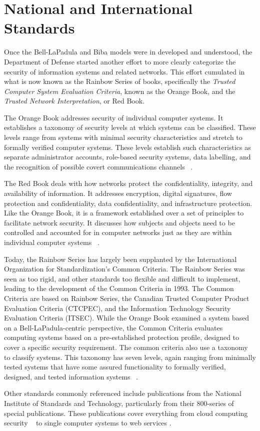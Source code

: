 \section{National and International Standards}
Once the Bell-LaPadula and Biba models were in developed and understood, the Department of Defense started another effort to more clearly categorize the security of information systems and related networks.  This effort cumulated in what is now known as the Rainbow Series of books, specifically the {\it Trusted Computer System Evaluation Criteria}, known as the Orange Book, and the {\it Trusted Network Interpretation}, or Red Book.

The Orange Book addresses security of individual computer systems.  It establishes a taxonomy of security levels at which systems can be classified.  These levels range from systems with minimal security characteristics and stretch to formally verified computer systems.  These levels establish such characteristics as separate administrator accounts, role-based security systems, data labelling, and the recognition of possible covert communications channels ~\cite{OrangeBook}.

The Red Book deals with how networks protect the confidentiality, integrity, and availability of information.  It addresses encryption, digital signatures, flow protection and confidentiality, data confidentiality, and infrastructure protection.  Like the Orange Book, it is a framework established over a set of principles to facilitate network security.  It discusses how subjects and objects need to be controlled and accounted for in computer networks just as they are within individual computer systems ~\cite{RedBook}.

Today, the Rainbow Series has largely been supplanted by the International Organization for Standardization's Common Criteria.  The Rainbow Series was seen as too rigid, and other standards too flexible and difficult to implement, leading to the development of the Common Criteria in 1993.  The Common Criteria are based on Rainbow Series, the Canadian Trusted Computer Product Evaluation Criteria (CTCPEC), and the Information Technology Security Evaluation Criteria (ITSEC).  While the Orange Book examined a system based on a Bell-LaPadula-centric perspective, the Common Criteria evaluates computing systems based on a pre-established protection profile, designed to cover a specific security requirement.  The common criteria also use a taxonomy to classify systems.  This taxonomy has seven levels, again ranging from minimally tested systems that have some assured functionality to formally verified, designed, and tested information systems ~\cite{CommonCriteria}.

Other standards commonly referenced include publications from the National Institute of Standards and Technology, particularly from their 800-series of special publications.  These publications cover everything from cloud computing security ~\cite{800-144} to single computer systems \cite{800-12} to web services \cite{800-95}.
